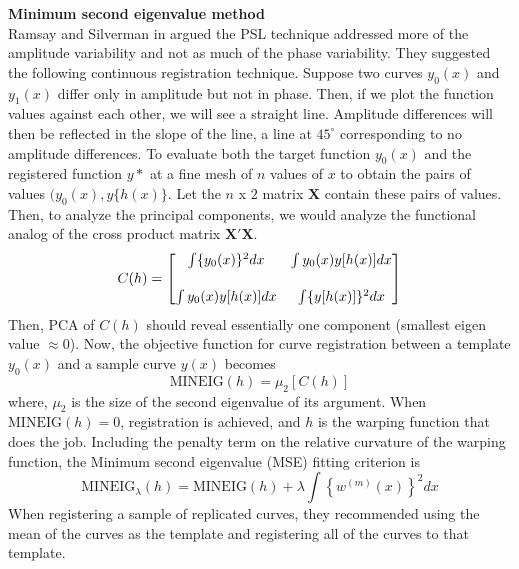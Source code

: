 \noindent
{\bf{Minimum second eigenvalue method}} \\
Ramsay and Silverman in \cite{Ramsay_2006_Functional} argued the PSL technique addressed more of the amplitude variability and not as much of the phase variability. They suggested the following continuous registration technique. Suppose two curves $y_0(x)$ and $y_1(x)$ differ only in amplitude but not in phase. Then, if we plot the function values against each other, we will see a straight line. Amplitude
differences will then be reflected in the slope of the line, a line at $45^{\circ}$ corresponding to no amplitude differences. To evaluate both the target function $y_0(x)$ and the registered function 
$y*$ at a fine mesh of $n$ values of $x$ to obtain the pairs of values $(y_0(x), y\{h(x) \}$. Let the $n$ x $2$ matrix $\mathbf{X}$ contain these pairs of values. Then, to analyze the principal components, we would analyze the functional analog of the cross product matrix $\mathbf{X'X}$. 
\begin{equation}
C(h) = 
\begin{bmatrix}
\int \{y_0(x) \}^2dx & \int y_0(x) y[h(x)]dx \vspace{0.5cm} \\ 
\int y_0(x) y[h(x)]dx & \int \{y[h(x)]\}^2dx
\end{bmatrix}
\end{equation}
Then, PCA of $C(h)$ should reveal essentially one component (smallest eigen value $\approx 0$). Now, the objective function for curve registration between a template $y_0(x)$ and a sample curve $y(x)$ becomes
\[ \text{MINEIG}(h) = \mu_2[C(h)]\]
where, $\mu_2$ is the size of the second eigenvalue of its argument. When $\text{MINEIG}(h)=0$, registration is achieved, and $h$ is the warping function that does the job. Including the penalty term on the relative curvature of the warping function, the Minimum second eigenvalue (MSE) fitting criterion is
\begin{equation}
\text{MINEIG}_{\lambda}(h) = \text{MINEIG}(h) + \lambda \displaystyle \int \left\{ w^{(m)}(x) \right\}^2 dx
\end{equation}
When registering a sample of replicated curves, they \cite{Ramsay_etal_2009_Functional_R} recommended using the mean of the curves as the template and registering all of the curves to that template. 

